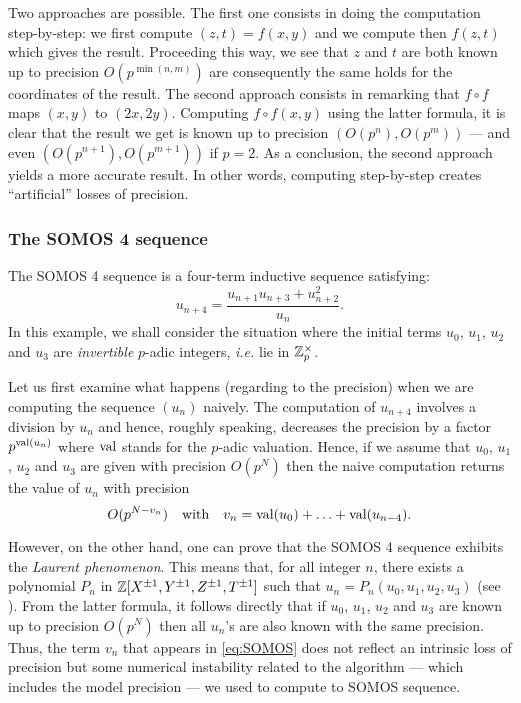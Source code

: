 \documentclass{lms}
\begin{document}
Two approaches are possible. The first one consists in doing the 
computation step-by-step: we first compute $(z,t) = f(x,y)$ and we 
compute then $f(z,t)$ which gives the result. Proceeding this way, we 
see that $z$ and $t$ are both known up to precision $O(p^{\min(n,m)})$ 
are consequently the same holds for the coordinates of the result.
The second approach consists in remarking that $f \circ f$ maps
$(x,y)$ to $(2x, 2y)$. Computing $f \circ f(x,y)$ using the latter
formula, it is clear that the result we get is known up to precision
$(O(p^n), O(p^m))$ --- and even $(O(p^{n+1}), O(p^{m+1}))$ if $p = 2$.
As a conclusion, the second approach yields a more accurate result.
In other words, computing step-by-step creates ``artificial'' losses 
of precision.

\subsubsection*{The SOMOS 4 sequence}

The SOMOS 4 sequence is a four-term inductive sequence satisfying:
$$u_{n+4} = \frac{u_{n+1} u_{n+3} + u_{n+2}^2}{u_n}.$$
In this example, we shall consider the situation where the initial
terms $u_0$, $u_1$, $u_2$ and $u_3$ are \emph{invertible} $p$-adic 
integers, \emph{i.e.} lie in $\mathbb Z_p^\times$.

Let us first examine what happens (regarding to the precision) when
we are computing the sequence $(u_n)$ naively. The computation of
$u_{n+4}$ involves a division by $u_n$ and hence, roughly speaking,
decreases the precision by a factor $p^{\text{\rm val}(u_n)}$ where $\text{\rm val}$
stands for the $p$-adic valuation. Hence, if we assume that $u_0$,
$u_1$, $u_2$ and $u_3$ are given with precision $O(p^N)$ then the
naive computation returns the value of $u_n$ with precision
\begin{equation}
\label{eq:SOMOS}
O(p^{N-v_n})
\quad \text{with}\quad
v_n = \text{\rm val}(u_0) + \ldots + \text{\rm val}(u_{n-4}).
\end{equation}

However, on the other hand, one can prove that the SOMOS 4 sequence 
exhibits the \emph{Laurent phenomenon}. This means that, for all integer 
$n$, there exists a polynomial $P_n$ in $\mathbb Z[X^{\pm 1}, Y^{\pm 1}, Z^{\pm 
1}, T^{\pm 1}]$ such that $u_n = P_n(u_0, u_1, u_2, u_3)$ (see \cite{Fomin-Zelevinsky}).
From the latter formula, it follows directly that if $u_0$, $u_1$,
$u_2$ and $u_3$ are known up to precision $O(p^N)$ then all $u_n$'s
are also known with the same precision. Thus, the term $v_n$ that 
appears in \eqref{eq:SOMOS} does not reflect an intrinsic loss of
precision but some numerical instability related to the algorithm ---
which includes the model precision --- we used to compute to SOMOS 
sequence.
\end{document}
